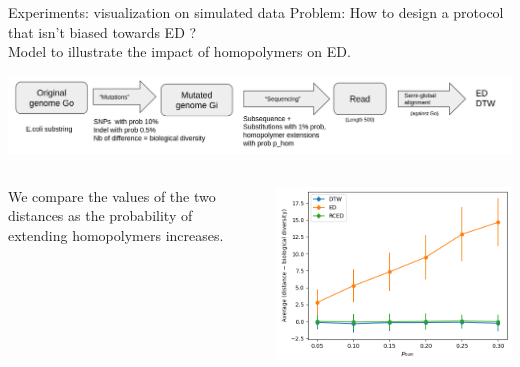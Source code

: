 \begin{frame}{Experiments: visualization on simulated data}
  Problem: How to design a protocol that isn't biased towards ED ?\\
  Model to illustrate the impact of homopolymers on ED.
  \begin{center}
    \includegraphics[scale=0.2]{figures/pipeline.png}
  \end{center}
  \vspace{-0.5cm}
  \begin{columns}
    
    We compare the values of the two distances as the probability of extending homopolymers increases.
    
    \begin{center}
      \includegraphics[scale=0.4]{figures/ecoli_10kb_N_100_fixed_ID_0.0005.png}
    \end{center}
  \end{columns}
\end{frame}



